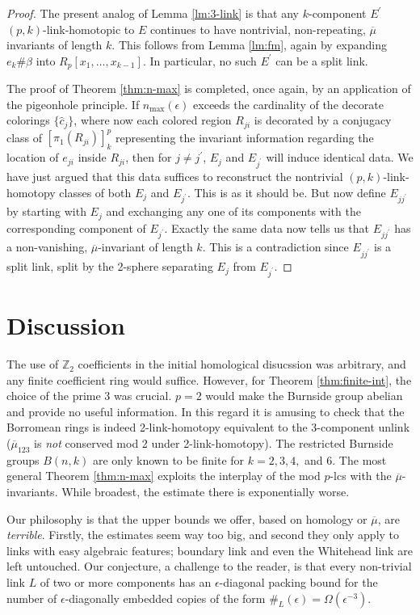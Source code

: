 \documentclass[12pt]{amsart}
\newcommand{\pr}{\prime}
\newcommand{\Z}{\mathbb{Z}}
\newcommand{\lbar}[1]{\overline{#1}}
\theoremstyle{definition}
\theoremstyle{remark}
\begin{document}
\begin{proof}
	The present analog of Lemma \ref{lm:3-link} is that any $k$-component $E^\pr$ $(p,k)$-link-homotopic to $E$ continues to have nontrivial, non-repeating, $\lbar{\mu}$ invariants of length $k$. This follows from Lemma \ref{lm:fm}, again by expanding $e_k \# \beta$ into $R_p[x_1, \dots, x_{k-1}]$. In particular, no such $E^\pr$ can be a split link.

	The proof of Theorem \ref{thm:n-max} is completed, once again, by an application of the pigeonhole principle. If $n_{\text{max}}(\epsilon)$ exceeds the cardinality of the decorate colorings $\{\hat{c}_j\}$, where now each colored region $R_{ji}$ is decorated by a conjugacy class of $[\pi_1(R_{ji})]_k^p$ representing the invariant information regarding the location of $e_{ji}$ inside $R_{ji}$, then for $j \neq j^\pr$, $E_j$ and $E_{j^\pr}$ will induce identical data. We have just argued that this data suffices to reconstruct the nontrivial $(p,k)$-link-homotopy classes of both $E_j$ and $E_{j^\pr}$. This is as it should be. But now define $E_{jj^\pr}$ by starting with $E_j$ and exchanging any one of its components with the corresponding component of $E_{j^\pr}$. Exactly the same data now tells us that $E_{jj^\pr}$ has a non-vanishing, $\lbar{\mu}$-invariant of length $k$. This is a contradiction since $E_{jj^\pr}$ is a split link, split by the 2-sphere separating $E_j$ from $E_{j^\pr}$.
\end{proof}

\section{Discussion}
The use of $\Z_2$ coefficients in the initial homological disucssion was arbitrary, and any finite coefficient ring would suffice. However, for Theorem \ref{thm:finite-int}, the choice of the prime 3 was crucial. $p = 2$ would make the Burnside group abelian and provide no useful information. In this regard it is amusing to check that the Borromean rings is indeed 2-link-homotopy equivalent to the 3-component unlink ($\lbar{\mu}_{123}$ is \emph{not} conserved mod 2 under 2-link-homotopy). The restricted Burnside groups $B(n,k)$ are only known to be finite for $k = 2,3,4,$ and 6. The most general Theorem \ref{thm:n-max} exploits the interplay of the mod $p$-lcs with the $\lbar{\mu}$-invariants. While broadest, the estimate there is exponentially worse.

Our philosophy is that the upper bounds we offer, based on homology or $\lbar{\mu}$, are \emph{terrible}. Firstly, the estimates seem way too big, and second they only apply to links with easy algebraic features; boundary link and even the Whitehead link are left untouched. Our conjecture, a challenge to the reader, is that every non-trivial link $L$ of two or more components has an $\epsilon$-diagonal packing bound for the number of $\epsilon$-diagonally embedded copies of the form $\#_L(\epsilon) = \Omega(\epsilon^{-3})$.
\end{document}
